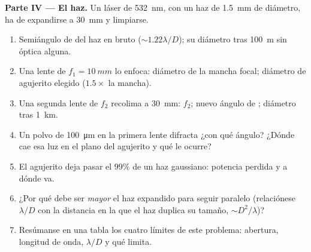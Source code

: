 \begin{problem}
\medskip
\noindent\textbf{Parte IV --- El haz.}
Un láser de \qty{532}{nm}, con un haz de \qty{1.5}{mm} de diámetro, ha de expandirse a
\qty{30}{mm} y limpiarse.
\begin{enumerate}[resume]
  \item Semiángulo de  del haz en bruto ($\sim1.22\lambda/D$); su
        diámetro tras \qty{100}{m} sin óptica alguna.
  \item Una lente de $f_1 = \qty{10}{mm}$ lo enfoca: diámetro de la mancha focal;
        diámetro de agujerito elegido ($1.5\times$ la mancha).
  \item Una segunda lente de $f_2$ recolima a \qty{30}{mm}: $f_2$; nuevo
        ángulo de ; diámetro tras \qty{1}{km}.
  \item Un polvo de \qty{100}{\micro m} en la primera lente difracta ¿con qué ángulo?
        ¿Dónde cae esa luz en el plano del agujerito y qué
        le ocurre?
  \item El agujerito deja pasar el $99\%$ de un haz gaussiano: potencia perdida y
        a dónde va.
  \item ¿Por qué debe ser \emph{mayor} el haz expandido para seguir paralelo
        (relaciónese $\lambda/D$ con la distancia en la que el haz duplica su tamaño,
        $\sim D^2/\lambda$)?
  \item Resúmanse en una tabla los cuatro límites de este problema: abertura,
        longitud de onda, $\lambda/D$ y qué limita.
\end{enumerate}
\end{problem}
